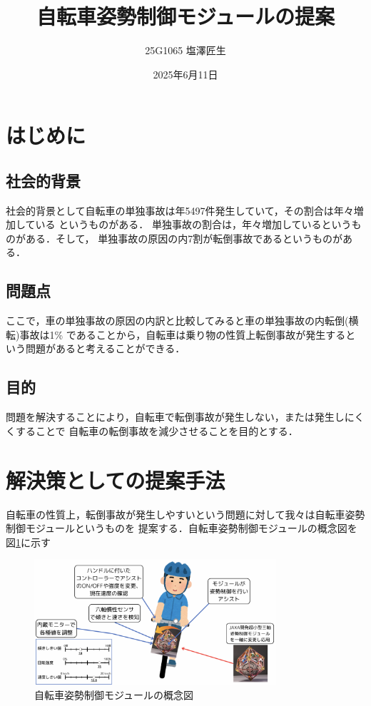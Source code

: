 \documentclass[uplatex,dvipdfmx]{jsarticle}
\begin{document}
\title{自転車姿勢制御モジュールの提案}
\author{25G1065 塩澤匠生}
\date{2025年6月11日}
\maketitle
\section{はじめに}

\subsection{社会的背景}

社会的背景として自転車の単独事故は年5497件発生していて，その割合は年々増加している
というものがある\cite{jikokensuu}．
単独事故の割合は，年々増加しているというものがある．そして，
単独事故の原因の内7割が転倒事故であるというものがある\cite{tandokuWariai}．

\subsection{問題点}

ここで，車の単独事故の原因の内訳と比較してみると車の単独事故の内転倒(横転)事故は1\%
であることから，自転車は乗り物の性質上転倒事故が発生するという問題があると考えることができる．




\subsection{目的}
問題を解決することにより，自転車で転倒事故が発生しない，または発生しにくくすることで
自転車の転倒事故を減少させることを目的とする．


\section{解決策としての提案手法}

自転車の性質上，転倒事故が発生しやすいという問題に対して我々は自転車姿勢制御モジュールというものを
提案する．自転車姿勢制御モジュールの概念図を図\ref{fig:moduleGainenn}に示す

\begin{figure}[H]
    \centering
    \includegraphics[width=0.8\textwidth]{fig/moduleGainenn2.png}
    \caption{自転車姿勢制御モジュールの概念図}
    \label{fig:moduleGainenn}
\end{figure}
\end{document}
